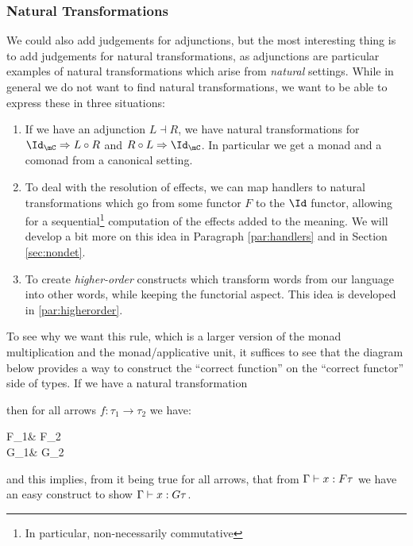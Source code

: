 \subsubsection{Natural Transformations}
\label{subsubsec:transnat}
We could also add judgements for adjunctions, but the most interesting thing is
to add judgements for natural transformations, as adjunctions are particular
examples of natural transformations which arise from \emph{natural} settings.
While in general we do not want to find natural transformations, we want to be
able to express these in three situations:
\begin{enumerate}
	\item If we have an adjunction $L\dashv R$, we have natural transformations
	      for $\Id_{\mC} \Rightarrow L \circ R$ and $R\circ L \Rightarrow \Id_{\mC}$.
	      In particular we get a monad and a comonad from a canonical setting.
	\item To deal with the resolution of effects, we can map handlers to natural
	      transformations which go from some functor $F$ to the $\Id$ functor,
	      allowing for a sequential\footnote{In particular, non-necessarily
		      commutative} computation of the effects added to the meaning.
	      We will develop a bit more on this idea in Paragraph \ref{par:handlers}
	      and in Section \ref{sec:nondet}.
	\item To create \emph{higher-order} constructs which transform words from our
	      language into other words, while keeping the functorial aspect.
	      This idea is developed in \ref{par:higherorder}.
\end{enumerate}
To see why we want this rule, which is a larger version of the monad
multiplication and the monad/applicative unit, it suffices to see that the
diagram below provides a way to construct the ``correct function'' on the
``correct functor'' side of types. If we have a natural transformation
then for all arrows $f: \tau_{1} \to \tau_{2}$ we have:
\begin{category}
	F\tau_{1}\ar[r, "Ff"] &
	F\tau_{2}\\
	G\tau_{1}\ar[r, "Gf"] & G\tau_{2}
\end{category}
and this implies, from it being true for all arrows, that from $\Gamma\vdash x: F\tau$
we have an easy construct to show $\Gamma\vdash x: G\tau$.

